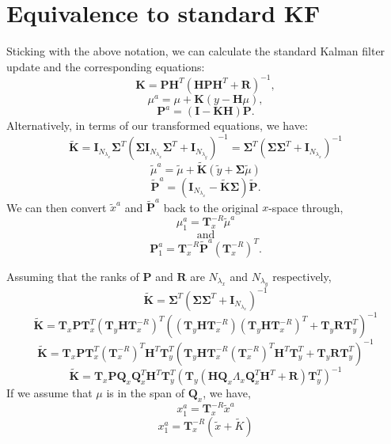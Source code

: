 \documentclass[11pt]{article} %
\newcommand{\mat}{\mathbf}
\begin{document}
\section{Equivalence to standard KF}

Sticking with the above notation, we can calculate the standard Kalman
filter update and the corresponding equations:
\[
  \mat{K} = \mat{P}\mat{H}^T (\mat{H} \mat{P} \mat{H}^T + \mat{R})^{-1},
\]
\[
  \mu^a = \mu + \mat{K} (y - \mat{H} \mu),
\]
\[
  \mat{P}^a = (\mat{I} - \mat{K} \mat{H}) \mat{P}.
\]
Alternatively, in terms of our transformed equations, we have:
\[
  \tilde{\mat{K}} = \mat{I}_{N_{\lambda_x}} \mat{\Sigma}^T ( \mat{\Sigma} \mat{I}_{N_{\lambda_x}}
  \mat{\Sigma}^T + \mat{I}_{N_{\lambda_y}})^{-1} = \mat{\Sigma}^T (\mat{\Sigma}
  \mat{\Sigma}^T + \mat{I}_{N_{\lambda_x}})^{-1}
\]
\[
  \tilde{\mu}^a = \tilde{\mu} + \tilde{\mat{K}}(\tilde{y} + \mat{\Sigma} \tilde{\mu})
\]
\[
  \tilde{\mat{P}}^a = (\mat{I}_{N_{\lambda_x}} - \tilde{\mat{K}} \mat{\Sigma}) \tilde{\mat{P}}.
\]
We can then convert $\tilde{x}^a$ and $\tilde{\mat{P}}^a$ back to the
original $x$-space through,
\[
  \mu^a_1 = \mat{T}_x^{-R} \tilde{\mu}^a
\]
\[
  \text{ and }
\]
\[
  \mat{P}^a_1 = \mat{T}_x^{-R} \tilde{\mat{P}}^a \left(\mat{T}_x^{-R}\right)^T.
\]

Assuming that the ranks of $\mat{P}$ and $\mat{R}$ are $N_{\lambda_x}$
and $N_{\lambda_y}$ respectively,
\[
  \tilde{\mat{K}} = \mat{\Sigma}^T (\mat{\Sigma} \mat{\Sigma}^T +
  \mat{I}_{N_{\lambda_x}})^{-1}
\]
\[
  \tilde{\mat{K}} = \mat{T}_x \mat{P} \mat{T}_x^T (\mat{T}_y \mat{H}
  \mat{T}_x^{-R})^T \left((\mat{T}_y \mat{H} \mat{T}_x^{-R})(\mat{T}_y
  \mat{H} \mat{T}_x^{-R})^T + \mat{T}_y \mat{R} \mat{T}_y^T \right)^{-1}
\]
\[
  \tilde{\mat{K}} = \mat{T}_x \mat{P} \mat{T}_x^T \left( \mat{T}_x^{-R}
  \right)^T \mat{H}^T \mat{T}_y^T
  \left( \mat{T}_y \mat{H} \mat{T}_x^{-R} \left( \mat{T}_x^{-R}
    \right)^T \mat{H}^T \mat{T}_y^T + \mat{T}_y \mat{R} \mat{T}_y^T \right)^{-1}
\]
\[
  \tilde{\mat{K}} = \mat{T}_x \mat{P} \mat{Q}_x \mat{Q}_x^T \mat{H}^T \mat{T}_y^T
  \left( \mat{T}_y \left( \mat{H} \mat{Q}_x \Lambda_x \mat{Q}_x^T
      \mat{H}^T + \mat{R}\right) \mat{T}_y^T \right)^{-1}
\]
If we assume that $\mu$ is in the span of $\mat{Q}_x$, we have,
\[
   x^a_1 = \mat{T}_x^{-R} \tilde{x}^a
\]
\[
   x^a_1 = \mat{T}_x^{-R} \left( \tilde{x} + \tilde{K} \right)
\]


\end{document}
